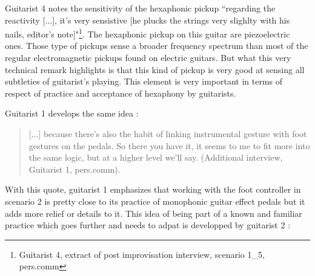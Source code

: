 \documentclass{article}
\begin{document}
Guitarist 4 notes the sensitivity of the hexaphonic pickup ``regarding the reactivity [...], it's very sensistive [he plucks the strings very slighlty with his nails, editor's note]"\footnote{Guitarist 4, extract of post improvisation interview,  scenario 1\_5, pers.comm}. The hexaphonic pickup on this guitar are piezoelectric ones. Those type of pickups sense a broader frequency spectrum \cite{sci:Lemme_SoundSecret_electricGuitar} than most of the regular electromagnetic pickups found on electric guitars. 
But what this very technical remark highlights is that this kind of pickup is very good at sensing all subtleties of guitarist's playing. This element is very important in terms of respect of practice and acceptance of hexaphony by guitarists. 


Guitarist 1 develops the same idea :


\begin{quote}
[...] because there's also the habit of linking instrumental gesture with foot gestures on the pedals. So there you have it, it seems to me to fit more into the same logic, but at a higher level we'll say. (Additional interview, Guitarist 1, pers.comm).
\end{quote}

With this quote, guitarist 1 emphasizes that working with the foot controller in scenario 2 is pretty close to its practice of monophonic guitar effect pedals but it adds more relief or details to it. This idea of being part of a known and familiar practice which goes further and needs to adpat is developped by guitarist 2 : 
\end{document}
